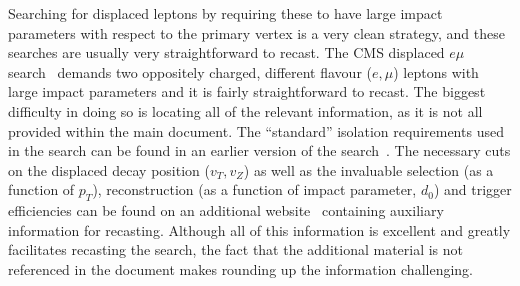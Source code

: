 Searching for displaced leptons by requiring these to have large impact parameters with respect to the primary vertex is a very clean strategy, and these searches are usually very straightforward to recast. 
The CMS displaced $e\mu$ search~\cite{Khachatryan:2014mea} demands two
oppositely charged, different flavour ($e ,\mu$) leptons with large impact
parameters and it is fairly straightforward to recast. The biggest difficulty
in doing so is locating all of the relevant information, as it is not all
provided within the main document. The ``standard'' isolation requirements used
in the search can be found in an earlier version of the
search~\cite{CMS:2014bra}.
The necessary cuts on the displaced decay position ($v_{T},v_{Z}$) as well as
the invaluable selection (as a function of $p_T$), reconstruction (as a function
of impact parameter, $d_0$) and trigger efficiencies can be found on an
additional website~\cite{CMSemuEfficiency} containing auxiliary information for
recasting.  Although all of this information is excellent and greatly
facilitates recasting the search, the fact that the additional material is not
referenced in the document makes rounding up the information challenging.

